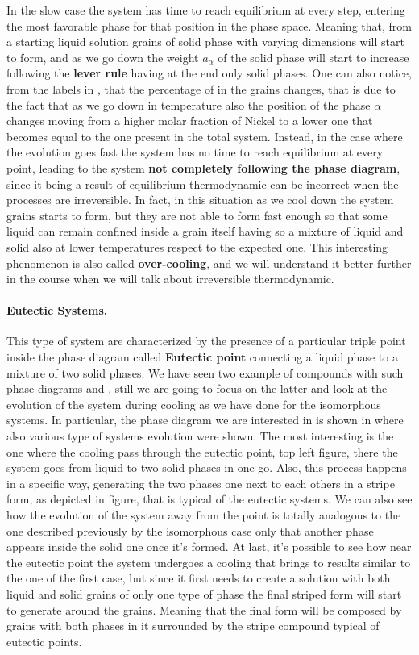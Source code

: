 In the slow case the system has time to reach equilibrium at every step, entering the most favorable phase for that position in the phase space. Meaning that, from a starting liquid solution grains of solid phase with varying dimensions will start to form, and as we go down the weight $a_\alpha$ of the solid phase will start to increase following the \textbf{lever rule} having at the end only solid phases. One can also notice, from the labels in , that the percentage of  in the grains changes, that is due to the fact that as we go down in temperature also the position of the phase $\alpha$ changes moving from a higher molar fraction of Nickel to a lower one that becomes equal to the one present in the total system. Instead, in the case where the evolution goes fast the system has no time to reach equilibrium at every point, leading to the system \textbf{not completely following the phase diagram}, since it being a result of equilibrium thermodynamic can be incorrect when the processes are irreversible. In fact, in this situation as we cool down the system grains starts to form, but they are not able to form fast enough so that some liquid can remain confined inside a grain itself having so a mixture of liquid and solid also at lower temperatures respect to the expected one. This interesting phenomenon is also called \textbf{over-cooling}, and we will understand it better further in the course when we will talk about irreversible thermodynamic.

\paragraph{Eutectic Systems.} This type of system are characterized by the presence of a particular triple point inside the phase diagram called \textbf{Eutectic point} connecting a liquid phase to a mixture of two solid phases. We have seen two example of compounds with such phase diagrams  and , still we are going to focus on the latter and look at the evolution of the system during cooling as we have done for the isomorphous systems. In particular, the phase diagram we are interested in is shown in  where also various type of systems evolution were shown. The most interesting is the one where the cooling pass through the eutectic point, top left figure, there the system goes from liquid to two solid phases in one go. Also, this process happens in a specific way, generating the two phases one next to each others in a stripe form, as depicted in figure, that is typical of the eutectic systems. We can also see how the evolution of the system away from the point is totally analogous to the one described previously by the isomorphous case only that another phase appears inside the solid one once it's formed. At last, it's possible to see how near the eutectic point the system undergoes a cooling that brings to results similar to the one of the first case, but since it first needs to create a solution with both liquid and solid grains of only one type of phase the final striped form will start to generate around the grains. Meaning that the final form will be composed by grains with both phases in it surrounded by the stripe compound typical of eutectic points.

